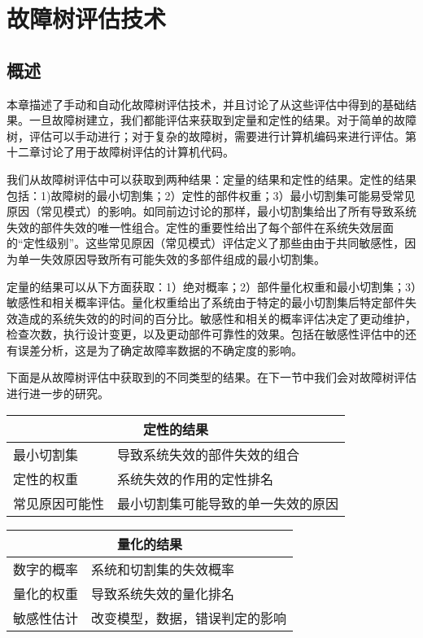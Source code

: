\documentclass[cn,11pt,chinese]{elegantbook}
\begin{document}
{\chapter{故障树评估技术}

\section{概述}

本章描述了手动和自动化故障树评估技术，并且讨论了从这些评估中得到的基础结果。一旦故障树建立，我们都能评估来获取到定量和定性的结果。对于简单的故障树，评估可以手动进行；对于复杂的故障树，需要进行计算机编码来进行评估。第十二章讨论了用于故障树评估的计算机代码。

我们从故障树评估中可以获取到两种结果：定量的结果和定性的结果。定性的结果包括：1)故障树的最小切割集；2）定性的部件权重；3）最小切割集可能易受常见原因（常见模式）的影响。如同前边讨论的那样，最小切割集给出了所有导致系统失效的部件失效的唯一性组合。定性的重要性给出了每个部件在系统失效层面的“定性级别”。这些常见原因（常见模式）评估定义了那些由由于共同敏感性，因为单一失效原因导致所有可能失效的多部件组成的最小切割集。

定量的结果可以从下方面获取：1）绝对概率；2）部件量化权重和最小切割集；3）敏感性和相关概率评估。量化权重给出了系统由于特定的最小切割集后特定部件失效造成的系统失效的的时间的百分比。敏感性和相关的概率评估决定了更动维护，检查次数，执行设计变更，以及更动部件可靠性的效果。包括在敏感性评估中的还有误差分析，这是为了确定故障率数据的不确定度的影响。

下面是从故障树评估中获取到的不同类型的结果。在下一节中我们会对故障树评估进行进一步的研究。

\begin{table}[htpb]
	\centering
	\begin{tabular}{@{}ll@{}}
		\toprule
		\multicolumn{2}{c}{\textbf{定性的结果}} \\ \midrule
		最小切割集       & 导致系统失效的部件失效的组合       \\
		定性的权重       & 系统失效的作用的定性排名         \\
		常见原因可能性     & 最小切割集可能导致的单一失效的原因    \\ \bottomrule
	\end{tabular}
\end{table}
\begin{table}[htpb]
	\centering
	\begin{tabular}{@{}ll@{}}
		\toprule
		\multicolumn{2}{c}{\textbf{量化的结果}} \\ \midrule
		数字的概率       & 系统和切割集的失效概率          \\
		量化的权重       & 导致系统失效的量化排名          \\
		敏感性估计       & 改变模型，数据，错误判定的影响      \\ \bottomrule
	\end{tabular}
\end{table}

}
\end{document}
